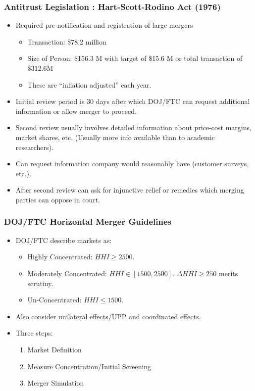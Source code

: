 \documentclass[xcolor=pdftex,dvipsnames,table,mathserif,aspectratio=169]{beamer}
\begin{document}
\begin{frame}
\frametitle{Antitrust Legislation : Hart-Scott-Rodino Act (1976)}
 \begin{itemize}
\item Required pre-notification and registration of large mergers
\begin{itemize}
\item Transaction: \$78.2 million
\item Size of Person: \$156.3 M with target of \$15.6 M or total transaction of \$312.6M
\item These are ``inflation adjusted'' each year.
\end{itemize}
\item Initial review period is 30 days after which DOJ/FTC can request additional information or allow merger to proceed.
\item Second review usually involves detailed information about  price-cost margins, market shares, etc. (Usually more info available than to academic researchers).
\item Can request information company would reasonably have (customer surveys, etc.).
\item After second review can ask for \alert{injunctive relief} or \alert{remedies} which merging parties can oppose in court.
 \end{itemize}
\end{frame}

\begin{frame}
\frametitle{DOJ/FTC Horizontal Merger Guidelines}
 \begin{itemize}
\item DOJ/FTC describe markets as:
\begin{itemize}
\item Highly Concentrated: $HHI \geq 2500$.
\item Moderately Concentrated: $HHI \in [1500,2500]$. $\Delta HHI \geq 250$ merits scrutiny.
\item Un-Concentrated: $HHI \leq 1500$.
\end{itemize}
\item Also consider \alert{unilateral effects}/UPP and \alert{coordinated effects}.
\item Three steps:
\begin{enumerate}
\item Market Definition
\item Measure Concentration/Initial Screening
\item Merger Simulation
\end{enumerate}
 \end{itemize}
\end{frame}
\end{document}
